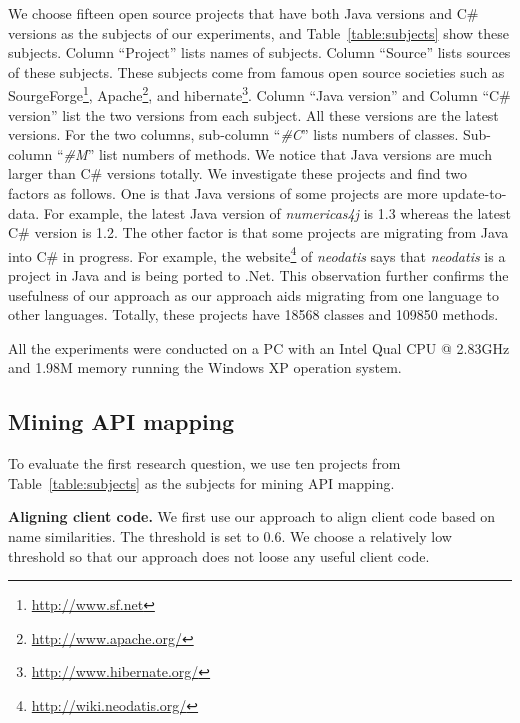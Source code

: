 We choose fifteen open source projects that have both Java versions
and C\# versions as the subjects of our experiments, and
Table~\ref{table:subjects} show these subjects. Column ``Project''
lists names of subjects. Column ``Source'' lists sources of these
subjects. These subjects come from famous open source societies such
as SourgeForge\footnote{\url{http://www.sf.net}},
Apache\footnote{\url{http://www.apache.org/}}, and
hibernate\footnote{\url{http://www.hibernate.org/}}. Column ``Java
version'' and Column ``C\# version'' list the two versions from each
subject. All these versions are the latest versions. For the two
columns, sub-column ``\emph{\#C}'' lists numbers of classes.
Sub-column ``\emph{\#M}'' list numbers of methods. We notice that
Java versions are much larger than C\# versions totally. We
investigate these projects and find two factors as follows. One is
that Java versions of some projects are more update-to-data. For
example, the latest Java version of \emph{numericas4j} is 1.3
whereas the latest C\# version is 1.2. The other factor is that some
projects are migrating from Java into C\# in progress. For example,
the website\footnote{\url{http://wiki.neodatis.org/}} of
\emph{neodatis} says that \emph{neodatis} is a project in Java and
is being ported to .Net. This observation further confirms the
usefulness of our approach as our approach aids migrating from one
language to other languages. Totally, these projects have 18568
classes and 109850 methods.

All the experiments were conducted on a PC with an Intel Qual CPU @
2.83GHz and 1.98M memory running the Windows XP operation system.
\subsection{Mining API mapping}
\label{sec:experiment:mining}

To evaluate the first research question, we use ten projects from
Table~\ref{table:subjects} as the subjects for mining API mapping.


\textbf{Aligning client code.} We first use our approach to align
client code based on name similarities. The threshold is set to 0.6.
We choose a relatively low threshold so that our approach does not
loose any useful client code.

